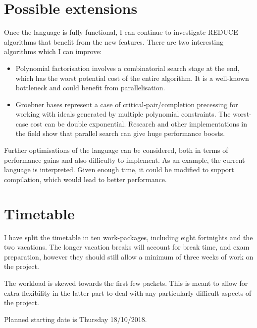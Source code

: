 \documentclass[12pt,a4paper,twoside]{article}
\begin{document}
	\section*{Possible extensions}
	
	Once the language is fully functional, I can continue to investigate REDUCE
	algorithms that benefit from the new features. There are two interesting
	algorithms which I can improve:
	
	\begin{itemize}
		\item Polynomial factorisation involves a combinatorial search stage at the
		end, which has the worst potential cost of the entire algorithm. It is a
		well-known bottleneck and could benefit from parallelisation.
		\item Groebner bases represent a case of critical-pair/completion precessing
		for working with ideals generated by multiple polynomial constraints.
		The worst-case cost can be double exponential. Research and other
		implementations in the field show that parallel search can give huge
		performance boosts.
		
	\end{itemize}
	
	Further optimisations of the language can be considered, both in terms of
	performance gains and also difficulty to implement.
	As an example, the current language is interpreted. Given enough time,
	it could be modified to support compilation, which would lead to better performance.
	
	\section*{Timetable}
	
	I have split the timetable in ten work-packages, including eight fortnights and the two
	vacations. The longer vacation breaks will account for break time, and exam preparation,
	however they should still allow a minimum of three weeks of work on the project.
	
	The workload is skewed towards the first few packets. This is meant to allow for extra
	flexibility in the latter part to deal with any particularly difficult aspects of the project.
	
	Planned starting date is Thursday 18/10/2018.
	
\end{document}
